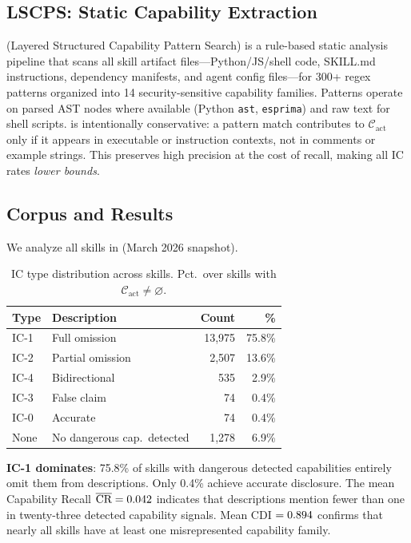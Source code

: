 
\subsection{LSCPS: Static Capability Extraction}

\lscps (Layered Structured Capability Pattern Search) is a
rule-based static analysis pipeline that scans all skill artifact
files---Python/JS/shell code, SKILL.md instructions,
dependency manifests, and agent config files---for 300+
regex patterns organized into 14 security-sensitive capability families.
Patterns operate on parsed AST nodes where available
(Python \texttt{ast}, \texttt{esprima}) and raw text for shell scripts.
\lscps is intentionally conservative: a pattern match contributes
to $\mathcal{C}_{\text{act}}$ only if it appears in executable
or instruction contexts, not in comments or example strings.
This preserves high precision at the cost of recall,
making all IC rates \emph{lower bounds}.

\subsection{Corpus and Results}
\label{sec:meas_results}

We analyze all \NskillsCH skills in \clawhub (March 2026 snapshot).

\begin{table}[t]
\centering
\caption{IC type distribution across \NskillsCH \clawhub skills.
  Pct.\ over skills with $\mathcal{C}_{\text{act}} \neq \varnothing$.}
\label{tab:ic_dist}
\small
\begin{tabular}{llrr}
\toprule
\textbf{Type} & \textbf{Description} & \textbf{Count} & \textbf{\%}\\
\midrule
IC-1 & Full omission  & 13,975 & 75.8\%\\
IC-2 & Partial omission & 2,507 & 13.6\%\\
IC-4 & Bidirectional  &   535 &  2.9\%\\
IC-3 & False claim    &    74 &  0.4\%\\
IC-0 & Accurate       &    74 &  0.4\%\\
\midrule
None & No dangerous cap.\ detected & 1,278 & 6.9\%\\
\bottomrule
\end{tabular}
\end{table}

\textbf{IC-1 dominates}: 75.8\% of skills with dangerous detected
capabilities entirely omit them from descriptions.
Only 0.4\% achieve accurate disclosure.
The mean Capability Recall $\overline{\text{CR}} = 0.042$ indicates
that descriptions mention fewer than one in twenty-three
detected capability signals.
Mean CDI $= 0.894$ confirms that nearly all skills have at least
one misrepresented capability family.

